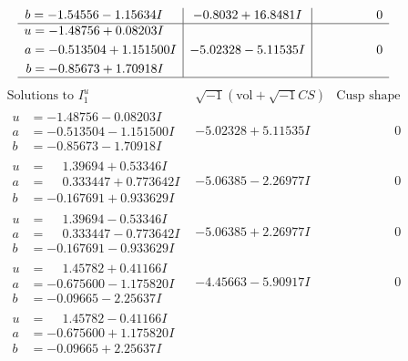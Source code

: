 \documentclass[1p]{elsarticle_modified}
\theoremstyle{definition}
\newcommand{\I}{\sqrt{-1}}
\begin{document}
$$\begin{array}{c|c|c}
\begin{aligned}
b &= -1.54556 - 1.15634 I\end{aligned}
 & -0.8032 + 16.8481 I & \phantom{-0.000000 } 0 \\ \hline\begin{aligned}
u &= -1.48756 + 0.08203 I \\
a &= -0.513504 + 1.151500 I \\
b &= -0.85673 + 1.70918 I\end{aligned}
 & -5.02328 - 5.11535 I & \phantom{-0.000000 } 0\\
 \hline 
 \end{array}$$\newpage$$\begin{array}{c|c|c}  
\text{Solutions to }I^u_{1}& \I (\text{vol} + \sqrt{-1}CS) & \text{Cusp shape}\\
 \hline 
\begin{aligned}
u &= -1.48756 - 0.08203 I \\
a &= -0.513504 - 1.151500 I \\
b &= -0.85673 - 1.70918 I\end{aligned}
 & -5.02328 + 5.11535 I & \phantom{-0.000000 } 0 \\ \hline\begin{aligned}
u &= \phantom{-}1.39694 + 0.53346 I \\
a &= \phantom{-}0.333447 + 0.773642 I \\
b &= -0.167691 + 0.933629 I\end{aligned}
 & -5.06385 - 2.26977 I & \phantom{-0.000000 } 0 \\ \hline\begin{aligned}
u &= \phantom{-}1.39694 - 0.53346 I \\
a &= \phantom{-}0.333447 - 0.773642 I \\
b &= -0.167691 - 0.933629 I\end{aligned}
 & -5.06385 + 2.26977 I & \phantom{-0.000000 } 0 \\ \hline\begin{aligned}
u &= \phantom{-}1.45782 + 0.41166 I \\
a &= -0.675600 - 1.175820 I \\
b &= -0.09665 - 2.25637 I\end{aligned}
 & -4.45663 - 5.90917 I & \phantom{-0.000000 } 0 \\ \hline\begin{aligned}
u &= \phantom{-}1.45782 - 0.41166 I \\
a &= -0.675600 + 1.175820 I \\
b &= -0.09665 + 2.25637 I\end{aligned}

\end{array}$$
\end{document}
